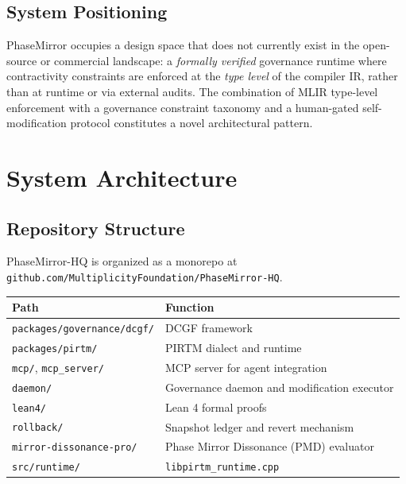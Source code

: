\documentclass[11pt,letterpaper]{article}
\theoremstyle{remark}
\begin{document}
\subsection{System Positioning}

PhaseMirror occupies a design space that does not currently exist in the
open-source or commercial landscape: a \emph{formally verified} governance
runtime where contractivity constraints are enforced at the \emph{type
level} of the compiler IR, rather than at runtime or via external audits.
The combination of MLIR type-level enforcement with a governance constraint
taxonomy and a human-gated self-modification protocol constitutes a
novel architectural pattern.

\section{System Architecture}

\subsection{Repository Structure}

PhaseMirror-HQ is organized as a monorepo at
\texttt{github.com/MultiplicityFoundation/PhaseMirror-HQ}.

\begin{center}
\begin{tabular}{ll}
\toprule
\textbf{Path} & \textbf{Function} \\
\midrule
\texttt{packages/governance/dcgf/} & DCGF framework \\
\texttt{packages/pirtm/} & PIRTM dialect and runtime \\
\texttt{mcp/}, \texttt{mcp\_server/} & MCP server for agent integration \\
\texttt{daemon/} & Governance daemon and modification executor \\
\texttt{lean4/} & Lean 4 formal proofs \\
\texttt{rollback/} & Snapshot ledger and revert mechanism \\
\texttt{mirror-dissonance-pro/} & Phase Mirror Dissonance (PMD) evaluator \\
\texttt{src/runtime/} & \texttt{libpirtm\_runtime.cpp} \\
\bottomrule
\end{tabular}
\end{center}
\end{document}
